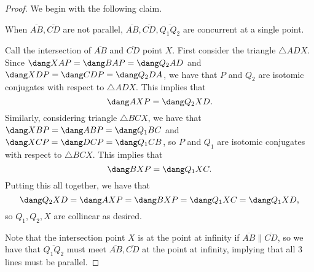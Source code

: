 \documentclass[letterpaper,oneside]{scrartcl}
\providecommand{\ol}{\overline}
\begin{document}
\begin{proof}
  We begin with the following claim.
  \begin{claim*}
    When \(\ol{AB},\ol{CD}\) are not parallel, \(\ol{AB},\ol{CD},\ol{Q_1Q_2}\) are concurrent at a single point.
  \end{claim*}
  \begin{subproof}
    Call the intersection of \(\ol{AB}\) and \(\ol{CD}\) point \(X\). First consider the triangle \(\triangle ADX\). Since \(\dang XAP = \dang BAP = \dang Q_2AD\) and \(\dang XDP = \dang CDP = \dang Q_2DA\), we have that \(P\) and \(Q_2\) are isotomic conjugates with respect to \(\triangle ADX\). This implies that \[\dang AXP = \dang Q_2XD.\] Similarly, considering triangle \(\triangle BCX\), we have that \(\dang XBP = \dang ABP = \dang Q_1BC\) and \(\dang XCP = \dang DCP = \dang Q_1CB\), so \(P\) and \(Q_1\) are isotomic conjugates with respect to \(\triangle BCX\). This implies that \[\dang BXP = \dang Q_1XC.\] Putting this all together, we have that \[\dang Q_2XD = \dang AXP = \dang BXP = \dang Q_1XC = \dang Q_1XD,\] so \(Q_1,Q_2,X\) are collinear as desired.
  \end{subproof}
  Note that the intersection point \(X\) is at the point at infinity if \(\ol{AB} \parallel \ol{CD}\), so we have that \(\ol{Q_1Q_2}\) must meet \(\ol{AB},\ol{CD}\) at the point at infinity, implying that all 3 lines must be parallel. 
\end{proof}
\end{document}

